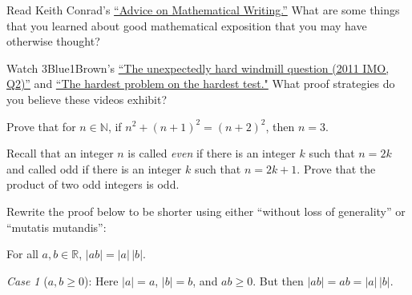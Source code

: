 \documentclass[11pt,letterpaper]{article}
\begin{document}

 Read Keith Conrad's \href{https://kconrad.math.uconn.edu/blurbs/proofs/writingtips.pdf}{``Advice on Mathematical Writing.''} What are some things that you learned about good mathematical exposition that you may have otherwise thought? \pspace





\newpage





 Watch 3Blue1Brown's \href{https://www.youtube.com/watch?v=M64HUIJFTZM}{``The unexpectedly hard windmill question (2011 IMO, Q2)''} and \href{https://www.youtube.com/watch?v=OkmNXy7er84}{``The hardest problem on the hardest test."} What proof strategies do you believe these videos exhibit? \pspace





\newpage





 Prove that for $n \in \mathbb{N}$, if $n^2 + (n + 1)^2= (n + 2)^2$, then $n= 3$. \pspace





\newpage





 Recall that an integer $n$ is called \textit{even} if there is an integer $k$ such that $n= 2k$ and called odd if there is an integer $k$ such that $n= 2k + 1$. Prove that the product of two odd integers is odd. \pspace





\newpage





 Rewrite the proof below to be shorter using either ``without loss of generality'' or ``mutatis mutandis'': \pspace

\begin{thm*}
For all $a, b \in \mathbb{R}$, $|ab|= |a| \, |b|$. 
\end{thm*}

\pf

\textit{Case 1} ($a, b \geq 0$): Here $|a|= a$, $|b|= b$, and $ab \geq 0$. But then $|ab|= ab = |a| \, |b|$. 
\end{document}
